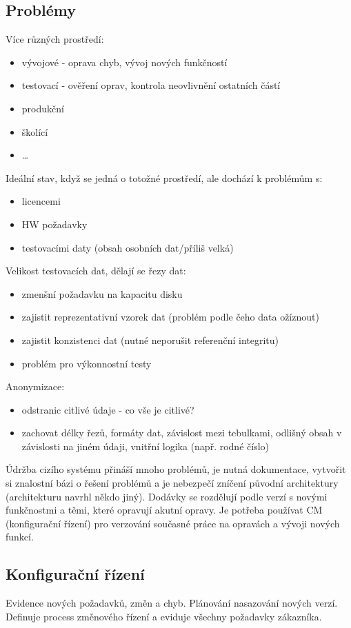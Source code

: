 \documentclass{szzclass}
\begin{document}
\subsection{Problémy}
Více různých prostředí:
\begin{itemize}
    \item vývojové - oprava chyb, vývoj nových funkčností
    \item testovací - ověření oprav, kontrola neovlivnění ostatních částí
    \item produkční
    \item školící
    \item \dots
\end{itemize}
Ideální stav, když se jedná o totožné prostředí, ale dochází k problémům s:
\begin{itemize}
    \item licencemi
    \item HW požadavky
    \item testovacími daty (obsah osobních dat/příliš velká)
\end{itemize}
Velikost testovacích dat, dělají se řezy dat:
\begin{itemize}
    \item zmenšní požadavku na kapacitu disku
    \item zajistit reprezentativní vzorek dat (problém podle čeho data ožíznout)
    \item zajistit konzistenci dat (nutné neporušit referenční integritu)
    \item problém pro výkonnostní testy
\end{itemize}
Anonymizace:
\begin{itemize}
    \item odstranic citlivé údaje - co vše je citlivé?
    \item zachovat délky řezů, formáty dat, závislost mezi tebulkami, odlišný obsah v závislosti na jiném údaji, vnitřní logika (např. rodné číslo)
\end{itemize}
Údržba cizího systému přináší mnoho problémů, je nutná dokumentace, vytvořit si znalostní bázi o řešení problémů a je nebezpečí zníčení původní architektury (architekturu navrhl někdo jiný).
\newline
Dodávky se rozdělují podle verzí s novými funkčnostmi a těmi, které opravují akutní opravy. Je potřeba používat CM (konfigurační řízení) pro verzování současné práce na
opravách a vývoji nových funkcí.
\subsection{Konfigurační řízení}
Evidence nových požadavků, změn a chyb. Plánování nasazování nových verzí.
Definuje process změnového řízení a eviduje všechny požadavky zákazníka.
\end{document}
